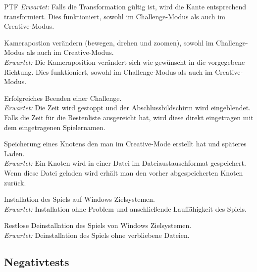 \begin{ids}{\gls{PTF}}
		\textit{Erwartet:} Falls die Transformation gültig ist, wird die Kante entsprechend transformiert. Dies funktioniert, sowohl im Challenge-Modus als auch im Creative-Modus.

		\id[ 80] Kamerapostion verändern (bewegen, drehen und zoomen), sowohl im Challenge-Modus als auch im Creative-Modus.\\
		
		\textit{Erwartet:} Die Kameraposition verändert sich wie gewünscht in die vorgegebene Richtung. Dies funktioniert, sowohl im Challenge-Modus als auch im Creative-Modus.

		\id[ 90] Erfolgreiches Beenden einer Challenge.\\
		
		\textit{Erwartet:} Die Zeit wird gestoppt und der Abschlussbildschirm wird eingeblendet. Falls die Zeit für die Bestenliste ausgereicht hat, wird diese direkt eingetragen mit dem eingetragenen Spielernamen.

		\id[100] Speicherung eines Knotens den man im Creative-Mode erstellt hat und späteres Laden.\\
		
		\textit{Erwartet:} Ein Knoten wird in einer Datei im Dateiaustauschformat gespeichert. Wenn diese Datei geladen wird erhält man den vorher abgespeicherten Knoten zurück.
		
		\id[120] Installation des Spiels auf Windows Zielsystemen.\\
		
		\textit{Erwartet:} Installation ohne Problem und anschließende Lauffähigkeit des Spiels.

		\id[130] Restlose Deinstallation des Spiels von Windows Zielsystemen.\\
		
		\textit{Erwartet:} Deinstallation des Spiels ohne verbliebene Dateien.
		
	

	\end{ids}


\clearpage


%
%
\subsection{Negativtests}

\vspace{1em}

